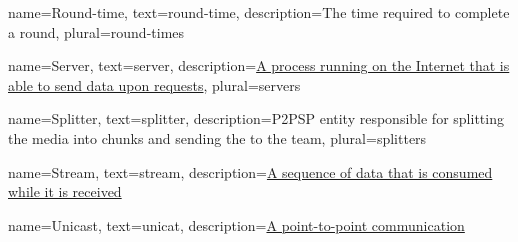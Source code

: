  {
    name={Round-time},
    text={round-time},
    description={The time required to complete a round},
    plural={round-times}
}

 {
    name={Server},
    text={server},
    description={\href{https://en.wikipedia.org/wiki/Server_(computing)}{A process running on the Internet that is able to send data upon requests}},
    plural={servers}
}

 {
    name={Splitter},
    text={splitter},
    description={P2PSP entity responsible for splitting the \gls{media} into chunks and sending the to the team},
    plural={splitters}
}

 {
    name={Stream},
    text={stream},
    description={\href{https://en.wikipedia.org/wiki/Streaming_media}{A sequence of data that is consumed while it is received}}
}



 {
    name={Unicast},
    text={unicat},
    description={\href{https://en.wikipedia.org/wiki/Unicast}{A point-to-point communication}}
}

